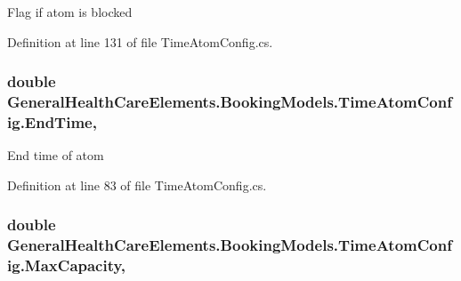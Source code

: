 Flag if atom is blocked 



Definition at line 131 of file Time\+Atom\+Config.\+cs.

\subsubsection[{\texorpdfstring{End\+Time}{EndTime}}]{\setlength{\rightskip}{0pt plus 5cm}double General\+Health\+Care\+Elements.\+Booking\+Models.\+Time\+Atom\+Config.\+End\+Time\hspace{0.3cm}{\ttfamily [get]}, {\ttfamily [set]}}\hypertarget{class_general_health_care_elements_1_1_booking_models_1_1_time_atom_config_a85a675effc75d84dfe1f7de543837475}{}\label{class_general_health_care_elements_1_1_booking_models_1_1_time_atom_config_a85a675effc75d84dfe1f7de543837475}


End time of atom 



Definition at line 83 of file Time\+Atom\+Config.\+cs.

\subsubsection[{\texorpdfstring{Max\+Capacity}{MaxCapacity}}]{\setlength{\rightskip}{0pt plus 5cm}double General\+Health\+Care\+Elements.\+Booking\+Models.\+Time\+Atom\+Config.\+Max\+Capacity\hspace{0.3cm}{\ttfamily [get]}, {\ttfamily [set]}}\hypertarget{class_general_health_care_elements_1_1_booking_models_1_1_time_atom_config_a81d7ce52b1dba5084fe66b7ef7f941d9}{}\label{class_general_health_care_elements_1_1_booking_models_1_1_time_atom_config_a81d7ce52b1dba5084fe66b7ef7f941d9}


